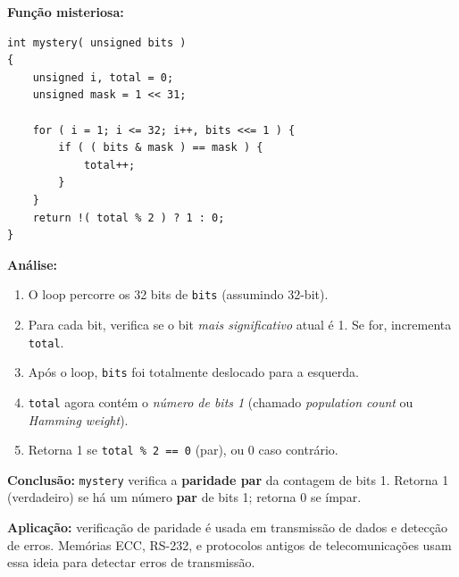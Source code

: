 \documentclass[12pt,a4paper]{article}
\begin{document}
\begin{respostabox}
\textbf{Função misteriosa:}
\begin{lstlisting}
int mystery( unsigned bits )
{
    unsigned i, total = 0;
    unsigned mask = 1 << 31;

    for ( i = 1; i <= 32; i++, bits <<= 1 ) {
        if ( ( bits & mask ) == mask ) {
            total++;
        }
    }
    return !( total % 2 ) ? 1 : 0;
}
\end{lstlisting}

\textbf{Análise:}
\begin{enumerate}[noitemsep]
  \item O loop percorre os 32 bits de \texttt{bits} (assumindo 32-bit).
  \item Para cada bit, verifica se o bit \textit{mais significativo} atual é 1.
  Se for, incrementa \texttt{total}.
  \item Após o loop, \texttt{bits} foi totalmente deslocado para a esquerda.
  \item \texttt{total} agora contém o \textit{número de bits 1} (chamado
  \textit{population count} ou \textit{Hamming weight}).
  \item Retorna 1 se \texttt{total \% 2 == 0} (par), ou 0 caso contrário.
\end{enumerate}

\textbf{Conclusão:} \texttt{mystery} verifica a \textbf{paridade par} da contagem
de bits 1. Retorna 1 (verdadeiro) se há um número \textbf{par} de bits 1; retorna
0 se ímpar.

\textbf{Aplicação:} verificação de paridade é usada em transmissão de dados e
detecção de erros. Memórias ECC, RS-232, e protocolos antigos de telecomunicações
usam essa ideia para detectar erros de transmissão.
\end{respostabox}
\end{document}
